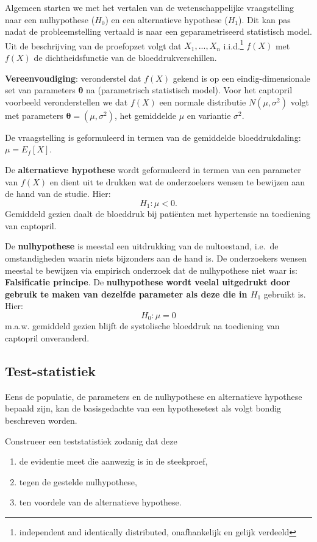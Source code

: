 \documentclass[12pt,dutch,coursenotes]{book}
\providecommand{\tightlist}{%
  \setlength{\itemsep}{0pt}\setlength{\parskip}{0pt}}
\let\rmarkdownfootnote\footnote%
\def\footnote{\protect\rmarkdownfootnote}
\theoremstyle{definition}
\theoremstyle{definition}
\theoremstyle{definition}
\theoremstyle{remark}
\begin{document}
Algemeen starten we met het vertalen van de wetenschappelijke
vraagstelling naar een nulhypothese (\(H_0\)) en een alternatieve
hypothese (\(H_1\)). Dit kan pas nadat de probleemstelling vertaald is
naar een geparametriseerd statistisch model. Uit de beschrijving van de
proefopzet volgt dat \(X_1,...,X_n\) i.i.d.\footnote{independent and
  identically distributed, onafhankelijk en gelijk verdeeld} \(f(X)\)
met \(f(X)\) de dichtheidsfunctie van de bloeddrukverschillen.

\textbf{Vereenvoudiging}: veronderstel dat \(f(X)\) gekend is op een
eindig-dimensionale set van parameters \(\mathbf{\theta}\) na
(parametrisch statistisch model). Voor het captopril voorbeeld
veronderstellen we dat \(f(X)\) een normale distributie
\(N(\mu,\sigma^2)\) volgt met parameters
\(\mathbf{\theta}=(\mu,\sigma^2)\), het gemiddelde \(\mu\) en variantie
\(\sigma^2\).

De vraagstelling is geformuleerd in termen van de gemiddelde
bloeddrukdaling: \(\mu=E_f[X]\).

De \textbf{alternatieve hypothese} wordt geformuleerd in termen van een
parameter van \(f(X)\) en dient uit te drukken wat de onderzoekers
wensen te bewijzen aan de hand van de studie. Hier: \[H_1: \mu<0.\]
Gemiddeld gezien daalt de bloeddruk bij patiënten met hypertensie na
toediening van captopril.

De \textbf{nulhypothese} is meestal een uitdrukking van de nultoestand,
i.e.~de omstandigheden waarin niets bijzonders aan de hand is. De
onderzoekers wensen meestal te bewijzen via empirisch onderzoek dat de
nulhypothese niet waar is: \textbf{Falsificatie principe}. De
\textbf{nulhypothese wordt veelal uitgedrukt door gebruik te maken van
dezelfde parameter als deze die in \(H_1\)} gebruikt is. Hier:
\[H_0 : \mu=0\] m.a.w. gemiddeld gezien blijft de systolische bloeddruk
na toediening van captopril onveranderd.

\subsection{Test-statistiek}\label{test-statistiek}

Eens de populatie, de parameters en de nulhypothese en alternatieve
hypothese bepaald zijn, kan de basisgedachte van een hypothesetest als
volgt bondig beschreven worden.

Construeer een teststatistiek zodanig dat deze

\begin{enumerate}
\def\labelenumi{\arabic{enumi}.}
\tightlist
\item
  de evidentie meet die aanwezig is in de steekproef,
\item
  tegen de gestelde nulhypothese,
\item
  ten voordele van de alternatieve hypothese.
\end{enumerate}
\end{document}
